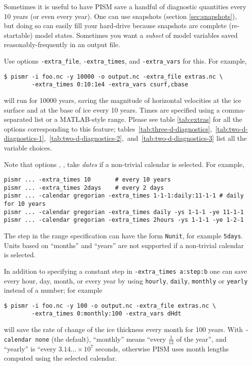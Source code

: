Sometimes it is useful to have PISM save a handful of diagnostic quantities every 10 years (or even every year).  One can use snapshots (section \ref{sec:snapshots}), but doing so can easily fill your hard-drive because snapshots are complete (re-startable) model states.  Sometimes you want a \emph{subset} of model variables saved reasonably-frequently in an output file.

Use options \texttt{-extra_file}, \texttt{-extra_times}, and \texttt{-extra_vars} for this.  For example,
\begin{verbatim}
$ pismr -i foo.nc -y 10000 -o output.nc -extra_file extras.nc \
        -extra_times 0:10:1e4 -extra_vars csurf,cbase
\end{verbatim} %
will run for 10000 years, saving the magnitude of horizontal velocities at the
ice surface and at the base of ice every 10 years. Times are specified using a
comma-separated list or a MATLAB-style range. Please see table \ref{tab:extras}
for all the options corresponding to this feature;
tables~\ref{tab:three-d-diagnostics},~\ref{tab:two-d-diagnostics-1},~\ref{tab:two-d-diagnostics-2},~and~\ref{tab:two-d-diagnostics-3}
list all the variable choices.

Note that options ,
,  take \emph{dates}
if a non-trivial calendar is selected. For example,
\begin{verbatim}
pismr ... -extra_times 10       # every 10 years
pismr ... -extra_times 2days    # every 2 days
pismr ... -calendar gregorian -extra_times 1-1-1:daily:11-1-1 # daily for 10 years
pismr ... -calendar gregorian -extra_times daily -ys 1-1-1 -ye 11-1-1
pismr ... -calendar gregorian -extra_times 2hours -ys 1-1-1 -ye 1-2-1
\end{verbatim}

The step in the range specification can have the form \texttt{Nunit},
for example \texttt{5days}. Units based on ``months'' and ``years''
are not supported if a non-trivial calendar is selected.

In addition to specifying a constant step in \texttt{-extra_times a:step:b} one can save every hour, day, month, or every year by using \texttt{hourly}, \texttt{daily}, \texttt{monthly} or \texttt{yearly} instead of a number; for example
\begin{verbatim}
$ pismr -i foo.nc -y 100 -o output.nc -extra_file extras.nc \
        -extra_times 0:monthly:100 -extra_vars dHdt
\end{verbatim} %
will save the rate of change of the ice thickness every month for 100
years. With \texttt{-calendar none} (the default), ``monthly'' means
``every $\frac 1 {12}$ of the year'', and ``yearly'' is ``every
$3.14\dots\times10^7$ seconds, otherwise PISM uses month lengths
computed using the selected calendar.

